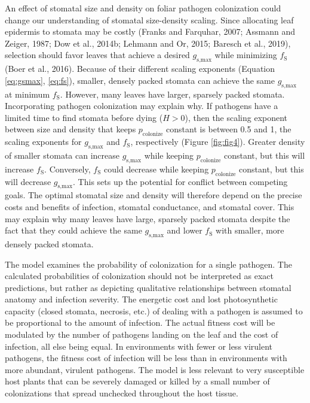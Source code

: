\documentclass[utf8]{frontiersSCNS}
\newcommand{\fs}{$f_\text{S}$}
\newcommand{\gsmax}{$g_\text{s,max}$}
\begin{document}
An effect of stomatal size and density on foliar pathogen colonization
could change our understanding of stomatal size-density scaling. Since
allocating leaf epidermis to stomata may be costly (Franks and Farquhar,
2007; Assmann and Zeiger, 1987; Dow et al., 2014b; Lehmann and Or, 2015;
Baresch et al., 2019), selection should favor leaves that achieve a
desired \gsmax{} while minimizing \fs{} (Boer et al., 2016). Because of
their different scaling exponents (Equation \ref{eq:gsmax},
\ref{eq:fs}), smaller, densely packed stomata can achieve the same
\gsmax{} at minimum \fs. However, many leaves have larger, sparsely
packed stomata. Incorporating pathogen colonization may explain why. If
pathogens have a limited time to find stomata before dying (\(H > 0\)),
then the scaling exponent between size and density that keeps
\(p_\text{colonize}\) constant is between 0.5 and 1, the scaling
exponents for \gsmax{} and \fs, respectively (Figure \ref{fig:fig4}).
Greater density of smaller stomata can increase \gsmax{} while keeping
\(p_\text{colonize}\) constant, but this will increase \fs. Conversely,
\fs{} could decrease while keeping \(p_\text{colonize}\) constant, but
this will decrease \gsmax. This sets up the potential for conflict
between competing goals. The optimal stomatal size and density will
therefore depend on the precise costs and benefits of infection,
stomatal conductance, and stomatal cover. This may explain why many
leaves have large, sparsely packed stomata despite the fact that they
could achieve the same \gsmax{} and lower \fs{} with smaller, more
densely packed stomata.

The model examines the probability of colonization for a single
pathogen. The calculated probabilities of colonization should not be
interpreted as exact predictions, but rather as depicting qualitative
relationships between stomatal anatomy and infection severity. The
energetic cost and lost photosynthetic capacity (closed stomata,
necrosis, etc.) of dealing with a pathogen is assumed to be proportional
to the amount of infection. The actual fitness cost will be modulated by
the number of pathogens landing on the leaf and the cost of infection,
all else being equal. In environments with fewer or less virulent
pathogens, the fitness cost of infection will be less than in
environments with more abundant, virulent pathogens. The model is less
relevant to very susceptible host plants that can be severely damaged or
killed by a small number of colonizations that spread unchecked
throughout the host tissue.
\end{document}
